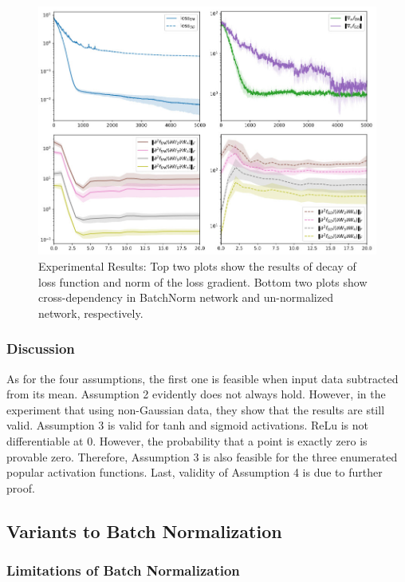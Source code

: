 \documentclass{article}
\begin{document}
\begin{figure} 
	\centering
    \includegraphics[width=\textwidth]{pics/batchNorm/decoupling_experiment.jpg}
	\caption{Experimental Results: Top two plots show the results of decay of loss function and norm of the loss gradient. Bottom two plots show cross-dependency in BatchNorm network and un-normalized network, respectively.}
	\label{fig:decouplingexperiment}
\end{figure}

\subsubsection{Discussion}

As for the four assumptions, the first one is feasible when input data subtracted from its mean. Assumption 2 evidently does not always hold. However, in the experiment that using non-Gaussian data, they show that the results are still valid. Assumption 3 is valid for tanh and sigmoid activations. ReLu is not differentiable at 0. However, the probability that a point is exactly zero is provable zero. Therefore, Assumption 3 is also feasible for the three enumerated popular activation functions. Last, validity of Assumption 4 is due to further proof. 

\subsection{Variants to Batch Normalization}

\subsubsection{Limitations of Batch Normalization}
\end{document}

